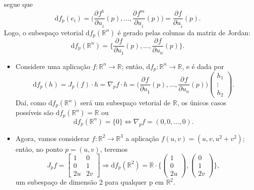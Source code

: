 \documentclass[../differential_geometry.tex]{subfiles}
\begin{document}
segue que
\[
	\mathrm{d}f_{p}(e_{i}) = \biggl(\frac{\partial^{}f^{1}}{\partial u_{i}^{}}(p), \dotsc , \frac{\partial^{}f^{m}}{\partial u_{i}^{}}(p)\biggr) = \frac{\partial^{}f}{\partial u_{i}^{}}(p).
\]
Logo, o subespaço vetorial \(\mathrm{d}f_{p}(\mathbb{R}^{n})\) é gerado pelas colunas da matriz de Jordan:
\[
	\mathrm{d}f_{p}(\mathbb{R}^{n})=\biggl\{\frac{\partial^{}f}{\partial u_1^{}}(p), \dotsc , \frac{\partial^{}f}{\partial u_{n}^{}}(p)\biggr\}.
\]
\begin{example}
	\begin{itemize}
		\item[1)] Considere uma aplicação \(f:\mathbb{R}^{n}\rightarrow \mathbb{R}\); então, \(\mathrm{d}f_{p}:\mathbb{R}^{n}\rightarrow \mathbb{R}\), e é dada por
		      \[
			      \mathrm{d}f_{p}(h)=J_{p}(f)\cdot h= \nabla_{p}f \cdot h = \biggl(\frac{\partial^{}f}{\partial u_1^{}}(p),\dotsc , \frac{\partial^{}f}{\partial u_{n}^{}}(p)\biggr) \begin{pmatrix}
				      h_1    \\
				      \vdots \\
				      h_{2}
			      \end{pmatrix}.
		      \]
		      Daí, como \(\mathrm{d}f_{p}(\mathbb{R}^{n})\) será um subespaço vetorial de \(\mathbb{R}\), os únicos casos possíveis são \(\mathrm{d}f_{p}(\mathbb{R}^{n})=\mathbb{R}\) ou
		      \[
			      \mathrm{d}f_{p}(\mathbb{R}^{n})=\{0\} \Longleftrightarrow  \nabla_{p}f=(0,0,\dotsc ,0).
		      \]
		\item[2)] Agora, vamos considerar \(f:\mathbb{R}^{2}\rightarrow \mathbb{R}^{3}\) a aplicação \(f(u, v)=(u, v, u^{2}+v^{2})\); então, no ponto \(p=(u, v)\), teremos
		      \[
			      J_{p}f=\begin{bmatrix}
				      1  & 0  \\
				      0  & 1  \\
				      2u & 2v
			      \end{bmatrix} \Rightarrow \mathrm{d}f_{p}(\mathbb{R}^{2})= \mathbb{R} \cdot \biggl\{\begin{pmatrix}
				      1 \\
				      0 \\
				      2u
			      \end{pmatrix}, \begin{pmatrix}
				      0 \\
				      1 \\
				      2v
			      \end{pmatrix}\biggr\},
		      \]
		      um subespaço de dimensão 2 para qualquer p em \(\mathbb{R}^{2}\).

\end{itemize}
\end{example}
\end{document}

